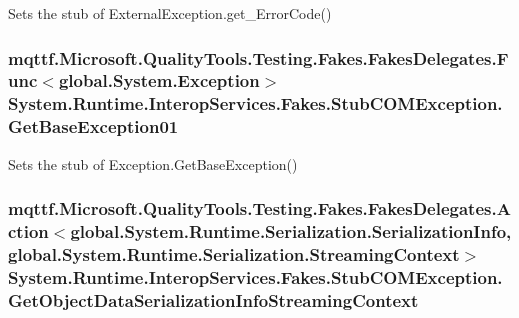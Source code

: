 Sets the stub of External\-Exception.\-get\-\_\-\-Error\-Code()

\hypertarget{class_system_1_1_runtime_1_1_interop_services_1_1_fakes_1_1_stub_c_o_m_exception_a4b096a66bad780b9edb907705418ca7c}{
\subsubsection[{Get\-Base\-Exception01}]{\setlength{\rightskip}{0pt plus 5cm}mqttf.\-Microsoft.\-Quality\-Tools.\-Testing.\-Fakes.\-Fakes\-Delegates.\-Func$<$global.\-System.\-Exception$>$ System.\-Runtime.\-Interop\-Services.\-Fakes.\-Stub\-C\-O\-M\-Exception.\-Get\-Base\-Exception01}}\label{class_system_1_1_runtime_1_1_interop_services_1_1_fakes_1_1_stub_c_o_m_exception_a4b096a66bad780b9edb907705418ca7c}


Sets the stub of Exception.\-Get\-Base\-Exception()

\hypertarget{class_system_1_1_runtime_1_1_interop_services_1_1_fakes_1_1_stub_c_o_m_exception_a4d4831e055dd162bbb2e8b19a2f5150d}{
\subsubsection[{Get\-Object\-Data\-Serialization\-Info\-Streaming\-Context}]{\setlength{\rightskip}{0pt plus 5cm}mqttf.\-Microsoft.\-Quality\-Tools.\-Testing.\-Fakes.\-Fakes\-Delegates.\-Action$<$global.\-System.\-Runtime.\-Serialization.\-Serialization\-Info, global.\-System.\-Runtime.\-Serialization.\-Streaming\-Context$>$ System.\-Runtime.\-Interop\-Services.\-Fakes.\-Stub\-C\-O\-M\-Exception.\-Get\-Object\-Data\-Serialization\-Info\-Streaming\-Context}}\label{class_system_1_1_runtime_1_1_interop_services_1_1_fakes_1_1_stub_c_o_m_exception_a4d4831e055dd162bbb2e8b19a2f5150d}


